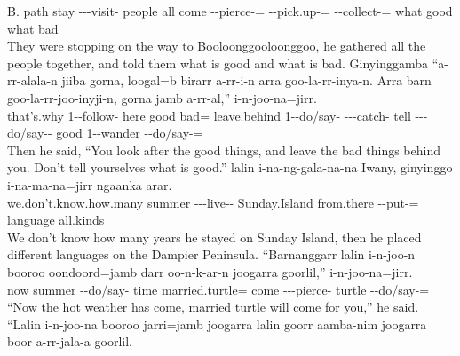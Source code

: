 \begin{exye}
B. path stay ---visit- people all come --pierce-= --pick.up-= --collect-= what good what bad\\
\ft They were stopping on the way to Booloonggooloonggoo, he gathered all the people together, and told them what is good and what is bad.
\exy {}
\gll Ginyinggamba ``a-rr-alala-n jiiba gorna, loogal=b birarr a-rr-i-n arra goo-la-rr-inya-n. Arra barn goo-la-rr-joo-inyji-n, gorna jamb a-rr-al,'' i-n-joo-na=jirr.\\
that's.why 1--follow- here good bad= leave.behind 1--do/say-  ---catch-  tell ---do/say-- good  1--wander --do/say-=\\
\ft Then he said, ``You look after the good things, and leave the bad things behind you. Don't tell yourselves what is good.''
\exy {}
 lalin i-na-ng-gala-na-na Iwany, ginyinggo i-na-ma-na=jirr ngaanka arar.\\
we.don't.know.how.many summer ---live-- Sunday.Island from.there --put-= language all.kinds\\
\ft We don't know how many years he stayed on Sunday Island, then he placed different languages on the Dampier Peninsula.
\exy {}
\gll ``Barnanggarr lalin i-n-joo-n booroo oondoord=jamb darr oo-n-k-ar-n joogarra goorlil,'' i-n-joo-na=jirr.\\
now summer --do/say- time married.turtle= come ---pierce-  turtle --do/say-=\\
\ft ``Now the hot weather has come, married turtle will come for you,'' he said.
\exy {}
\gll ``Lalin i-n-joo-na booroo jarri=jamb joogarra lalin goorr aamba-nim joogarra boor a-rr-jala-a goorlil.\\

\end{exye}
